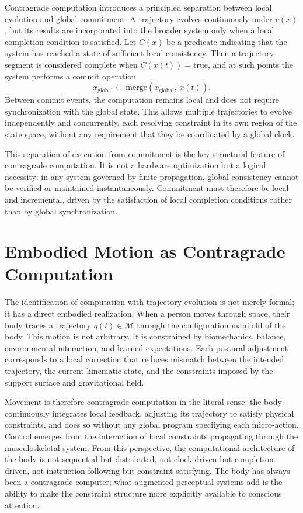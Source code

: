 \documentclass[12pt,a4paper,openany]{book}
\theoremstyle{plain}
\theoremstyle{definition}
\theoremstyle{remark}
\begin{document}
Contragrade computation introduces a principled separation between local evolution and global commitment. A trajectory evolves continuously under $v(x)$, but its results are incorporated into the broader system only when a local completion condition is satisfied. Let $C(x)$ be a predicate indicating that the system has reached a state of sufficient local consistency. Then a trajectory segment is considered complete when $C(x(t)) = \mathrm{true}$, and at such points the system performs a commit operation
\[
x_{\mathrm{global}} \leftarrow \mathrm{merge}(x_{\mathrm{global}},\, x(t)).
\]
Between commit events, the computation remains local and does not require synchronization with the global state. This allows multiple trajectories to evolve independently and concurrently, each resolving constraint in its own region of the state space, without any requirement that they be coordinated by a global clock.

This separation of execution from commitment is the key structural feature of contragrade computation. It is not a hardware optimization but a logical necessity: in any system governed by finite propagation, global consistency cannot be verified or maintained instantaneously. Commitment must therefore be local and incremental, driven by the satisfaction of local completion conditions rather than by global synchronization.

\section{Embodied Motion as Contragrade Computation}

The identification of computation with trajectory evolution is not merely formal; it has a direct embodied realization. When a person moves through space, their body traces a trajectory $q(t) \in \mathcal{M}$ through the configuration manifold of the body. This motion is not arbitrary. It is constrained by biomechanics, balance, environmental interaction, and learned expectations. Each postural adjustment corresponds to a local correction that reduces mismatch between the intended trajectory, the current kinematic state, and the constraints imposed by the support surface and gravitational field.

Movement is therefore contragrade computation in the literal sense: the body continuously integrates local feedback, adjusting its trajectory to satisfy physical constraints, and does so without any global program specifying each micro-action. Control emerges from the interaction of local constraints propagating through the musculoskeletal system. From this perspective, the computational architecture of the body is not sequential but distributed, not clock-driven but completion-driven, not instruction-following but constraint-satisfying. The body has always been a contragrade computer; what augmented perceptual systems add is the ability to make the constraint structure more explicitly available to conscious attention.
\end{document}
